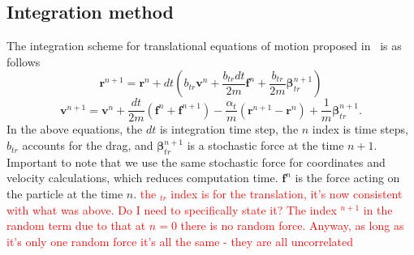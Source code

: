 \subsection{Integration method}
\label{subsec:integration_method}

The integration scheme for translational equations of motion proposed in~\cite{Taylor2013} is as follows
\begin{equation}
\label{eq:tr_coordinate_change}
	\boldsymbol{r}^{n+1} = \boldsymbol{r}^n + dt \left(
	 b_{tr} \boldsymbol{v}^n
	 + \frac{b_{tr} dt}{2m}\boldsymbol{f}^n
	 + \frac{b_{tr}}{2m}\boldsymbol{\beta}_{tr}^{n+1}
	\right)
\end{equation}
\begin{equation}
\label{eq:tr_velocity_change}
	\boldsymbol{v}^{n+1} = \boldsymbol{v}^n 
	 + \frac{dt}{2m}\left(
	 	\boldsymbol{f}^n + \boldsymbol{f}^{n+1}
	 \right)
	 - \frac{\alpha_{t}}{m}\left(
	 	\boldsymbol{r}^{n+1} - \boldsymbol{r}^n
	 \right)
	 + \frac{1}{m}\boldsymbol{\beta}_{tr}^{n+1}
	 .
\end{equation}
In the above equations, the $dt$ is integration time step, the $n$ index is time steps, $b_{tr}$ accounts for the drag, and $\boldsymbol{\beta}_{tr}^{n+1}$ is a stochastic force at the time $n+1$. Important to note that we use the same stochastic force for coordinates and velocity calculations, which reduces computation time. $\boldsymbol{f}^n$ is the force acting on the particle at the time $n$.
\textcolor{red}{the $ _{tr}$ index is for the translation, it's now consistent with what was above. Do I need to specifically state it? The index $ ^{n+1}$ in the random term due to that at $n=0$ there is no random force. Anyway, as long as it's only one random force it's all the same - they are all uncorrelated}

